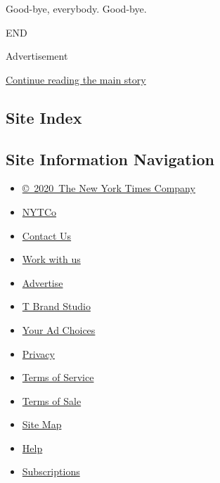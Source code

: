 Good-bye, everybody. Good-bye.

END

Advertisement

\protect\hyperlink{after-bottom}{Continue reading the main story}

\hypertarget{site-index}{%
\subsection{Site Index}\label{site-index}}

\hypertarget{site-information-navigation}{%
\subsection{Site Information
Navigation}\label{site-information-navigation}}

\begin{itemize}
\tightlist
\item
  \href{https://help.nytimes.com/hc/en-us/articles/115014792127-Copyright-notice}{©~2020~The
  New York Times Company}
\end{itemize}

\begin{itemize}
\tightlist
\item
  \href{https://www.nytco.com/}{NYTCo}
\item
  \href{https://help.nytimes.com/hc/en-us/articles/115015385887-Contact-Us}{Contact
  Us}
\item
  \href{https://www.nytco.com/careers/}{Work with us}
\item
  \href{https://nytmediakit.com/}{Advertise}
\item
  \href{http://www.tbrandstudio.com/}{T Brand Studio}
\item
  \href{https://www.nytimes.com/privacy/cookie-policy\#how-do-i-manage-trackers}{Your
  Ad Choices}
\item
  \href{https://www.nytimes.com/privacy}{Privacy}
\item
  \href{https://help.nytimes.com/hc/en-us/articles/115014893428-Terms-of-service}{Terms
  of Service}
\item
  \href{https://help.nytimes.com/hc/en-us/articles/115014893968-Terms-of-sale}{Terms
  of Sale}
\item
  \href{https://spiderbites.nytimes.com}{Site Map}
\item
  \href{https://help.nytimes.com/hc/en-us}{Help}
\item
  \href{https://www.nytimes.com/subscription?campaignId=37WXW}{Subscriptions}
\end{itemize}
